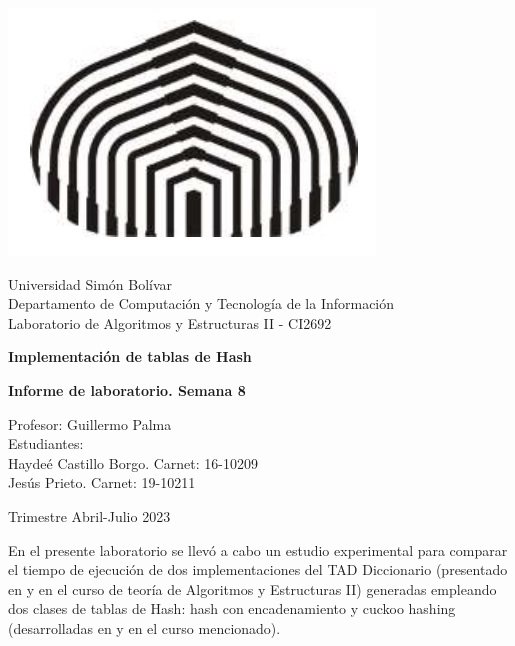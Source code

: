 \documentclass[titlepage]{article}
\begin{document}
	\begin{titlepage}
		\centering
		\includegraphics*[scale=0.2]{logo usb.jpg}
		
		\vspace{0.5cm}		
		
		\large 
		Universidad Sim\'on Bol\'ivar\\
		Departamento de Computaci\'on y Tecnolog\'ia de la Informaci\'on\\
		Laboratorio de Algoritmos y Estructuras II - CI2692
		
		\vspace{7cm}
		
		\LARGE
		\textbf{Implementaci\'on de tablas de Hash}
		
		\vspace{0.5cm}
		
		\textbf{Informe de laboratorio. Semana 8}
		
		\vspace{5cm}
		
		\large
		
		Profesor: Guillermo Palma\\
		Estudiantes:\\
		Hayde\'e Castillo Borgo. Carnet: 16-10209\\
		Jes\'us Prieto. Carnet: 19-10211
		
		\vspace{5cm}
		
		Trimestre Abril-Julio 2023
	\end{titlepage}
	
	En el presente laboratorio se llev\'o a cabo un estudio experimental para comparar el tiempo de ejecuci\'on de dos implementaciones del TAD Diccionario (presentado en \cite{1} y en el curso de teor\'ia de Algoritmos y Estructuras II) generadas empleando dos clases de tablas de Hash: hash con encadenamiento y cuckoo hashing (desarrolladas en \cite{2} y en el curso mencionado).\\
	
\end{document}
